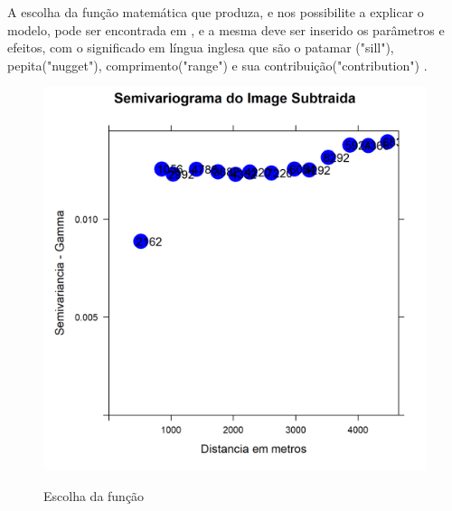   \hspace*{1.25 cm} A escolha da função matemática que produza, e nos possibilite a explicar o modelo, pode ser encontrada em  \cite[p.90]{delgado}, e a mesma deve ser inserido os parâmetros e efeitos, com o significado em língua inglesa que são o patamar ("sill"), pepita("nugget"), comprimento("range") e sua contribuição("contribution") .	\\	
			\begin{minipage}[t!]{0.31\textwidth}
				\begin{figure}[H]
					\centering \small \caption{ Escolha da função }
					\includegraphics[width=0.97\linewidth]{FIGURAS/semivariancaIMAG}
					\label{fig:variogramageor4}
				\end{figure}			
				
			\end{minipage}\hfill
